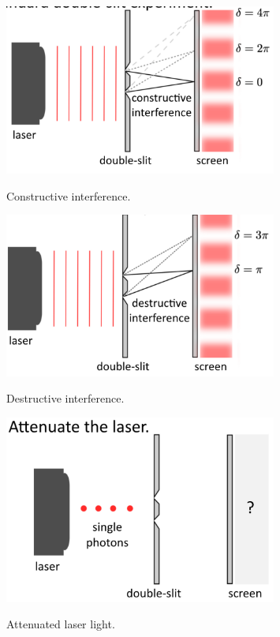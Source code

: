 \begin{figure}[H]
   \centering
    \includegraphics[width=0.8\textwidth]{lesson6/double_slit_constructive.pdf}
    \label{fig: 1}
    \begin{center}
        \caption{Constructive interference.}
    \end{center}
\end{figure}

\begin{figure}[H]
   \centering
    \includegraphics[width=0.8\textwidth]{lesson6/double_slit_destructive.pdf}
    \label{fig: 1}
    \begin{center}
        \caption{Destructive interference.}
    \end{center}
\end{figure}

\begin{figure}[H]
   \centering
    \includegraphics[width=0.8\textwidth]{lesson6/attenuate_laser.pdf}
    \label{fig: 1}
    \begin{center}
        \caption{Attenuated laser light.}
    \end{center}
\end{figure}

